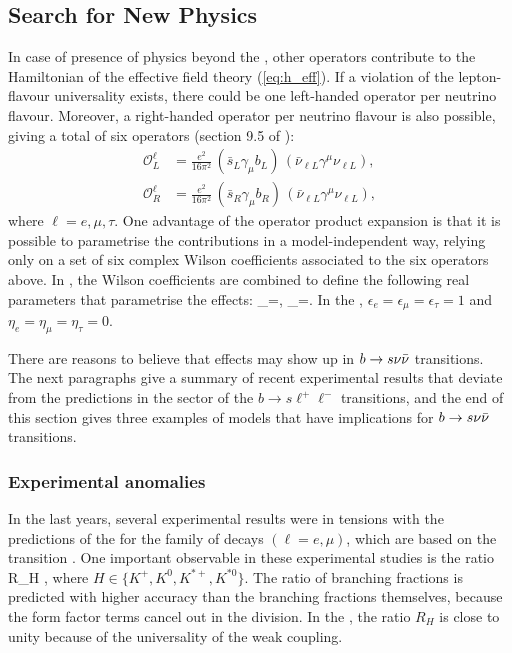 \subsection{Search for New Physics} \label{sec:new_physics}
In case of presence of physics beyond the \SM, other operators contribute to the Hamiltonian of the effective field theory (\cref{eq:h_eff}).
If a violation of the lepton-flavour universality exists, there could be one left-handed operator per neutrino flavour.
Moreover, a right-handed operator per neutrino flavour is also possible, giving a total of six operators (section 9.5 of \cite{Kou2020}):
\begin{align}
\mathcal{O}^\ell_{L}&=\frac{e^2}{16\pi^2}\,
(\bar{s}_L\gamma_{\mu}b_L)\,
(\bar{\nu}_{\ell L}\gamma^\mu\nu_{\ell L}),\\
\mathcal{O}^\ell_{R}&=\frac{e^2}{16\pi^2}\,
(\bar{s}_R\gamma_{\mu}b_R)\,
(\bar{\nu}_{\ell L}\gamma^\mu\nu_{\ell L}),
\end{align}
where $\ell=e,\mu,\tau$.
One advantage of the operator product expansion is that it is possible to parametrise the \NP contributions in a model-independent way, relying only on a set of six complex Wilson coefficients associated to the six operators above.
In \cite{Buras:2014fpa}, the Wilson coefficients are combined to define the following real parameters that parametrise the \NP effects:
\be
\epsilon_\ell=,
\hspace{0.5cm}
\eta_\ell=.
\ee
In the \SM, $\epsilon_e=\epsilon_\mu=\epsilon_\tau=1$ and $\eta_e=\eta_\mu=\eta_\tau=0$.

There are reasons to believe that \NP effects may show up in $b\rightarrow s\nu\bar{\nu}$ transitions.
The next paragraphs give a summary of recent experimental results that deviate from the \SM predictions in the sector of the $b\to s\ell^+\ell^-$ transitions, and the end of this section gives three examples of \NP models that have implications for $b\rightarrow s\nu\bar{\nu}$ transitions.
\subsubsection{Experimental anomalies} \label{sec:anomalies}
In the last years, several experimental results were in tensions with the predictions of the \SM for the family of decays \BKll $(\ell=e,\mu)$, which are based on the transition \bsll.
One important observable in these experimental studies is the ratio
\be
\label{eq:rk}
R_{H}\equiv
{},
\ee
where $H\in\{K^+,K^0,K^{*+},K^{*0}\}$.
The ratio of branching fractions is predicted with higher accuracy than the branching fractions themselves, because the form factor terms cancel out in the division.
In the \SM, the ratio $R_H$ is close to unity because of the universality of the weak coupling.

